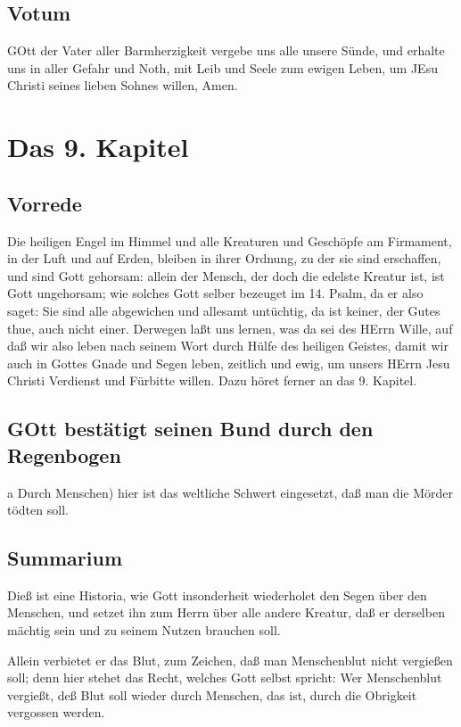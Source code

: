 \section{Votum}

GOtt der Vater aller Barmherzigkeit vergebe uns alle unsere Sünde, und erhalte uns in aller Gefahr und Noth, mit Leib und Seele zum ewigen Leben, um JEsu Christi seines lieben Sohnes willen, Amen.

\chapter{Das 9. Kapitel}

\section{Vorrede}

Die heiligen Engel im Himmel und alle Kreaturen und Geschöpfe am Firmament, in der Luft und auf Erden, bleiben in ihrer Ordnung, zu der sie sind erschaffen, und sind Gott gehorsam: allein der Mensch, der doch die edelste Kreatur ist, ist Gott ungehorsam; wie solches Gott selber bezeuget im 14. Psalm, da er also saget: Sie sind alle abgewichen und allesamt untüchtig, da ist keiner, der Gutes thue, auch nicht einer. Derwegen laßt uns lernen, was da sei des HErrn Wille, auf daß wir also leben nach seinem Wort durch Hülfe des heiligen Geistes, damit wir auch in Gottes Gnade und Segen leben, zeitlich und ewig, um unsers HErrn Jesu Christi Verdienst und Fürbitte willen. Dazu höret ferner an das 9. Kapitel.

\section{GOtt bestätigt seinen Bund durch den Regenbogen}

a Durch Menschen) hier ist das weltliche Schwert eingesetzt, daß man die Mörder tödten soll.

\section{Summarium}

Dieß ist eine Historia, wie Gott insonderheit wiederholet den Segen über den Menschen, und setzet ihn zum Herrn über alle andere Kreatur, daß er derselben mächtig sein und zu seinem Nutzen brauchen soll.

Allein verbietet er das Blut, zum Zeichen, daß man Menschenblut nicht vergießen soll; denn hier stehet das Recht, welches Gott selbst spricht: Wer Menschenblut vergießt, deß Blut soll wieder durch Menschen, das ist, durch die Obrigkeit vergossen werden.

